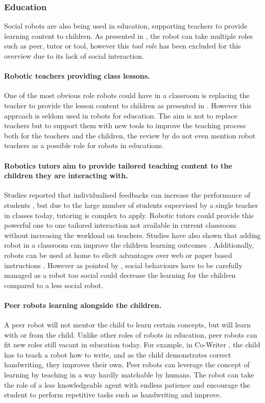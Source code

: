 \subsubsection{Education} 
	Social robots are also being used in education, supporting teachers to provide learning content to children. As presented in \cite{mubin2013review}, the robot can take multiple roles such as peer, tutor or tool, however this \textit{tool role} has been excluded for this overview due to its lack of social interaction.
	
	\paragraph{Robotic teachers providing class lessons.} 
	One of the most obvious role robots could have in a classroom is replacing the teacher to provide the lesson content to children as presented in \cite{verner2016science}. However this approach is seldom used in robots for education. The aim is not to replace teachers but to support them with new tools to improve the teaching process both for the teachers and the children, the review by \cite{mubin2013review} do not even mention robot teachers as a possible role for robots in educations. 
	
	\paragraph{Robotics tutors aim to provide tailored teaching content to the children they are interacting with.} 
	Studies reported that individualised feedbacks can increase the performance of students \citep{bloom19842}, but due to the large number of students supervised by a single teacher in classes today, tutoring is complex to apply. Robotic tutors could provide this powerful one to one tailored interaction not available in current classroom without increasing the workload on teachers. Studies have also shown that adding robot in a classroom can improve the children learning outcomes \citep{kanda2004interactive}. Additionally, robots can be used at home to elicit advantages over web or paper based instructions \citep{han2005educational}. However as pointed by \citet{kennedy2015robot}, social behaviours have to be carefully managed as a robot too social could decrease the learning for the children compared to a less social robot. 
	
	\paragraph{Peer robots learning alongside the children.}
	A peer robot will not mentor the child to learn certain concepts, but will learn with or from the child. Unlike other roles of robots in education, peer robots can fit new roles still vacant in education today. For example, in Co-Writer \citep{hood2015children}, the child has to teach a robot how to write, and as the child demonstrates correct handwriting, they improves their own. Peer robots can leverage the concept of learning by teaching \cite{frager1970learning} in a way hardly matchable by humans. The robot can take the role of a less knowledgeable agent with endless patience and encourage the student to perform repetitive tasks such as handwriting and improve.
	
